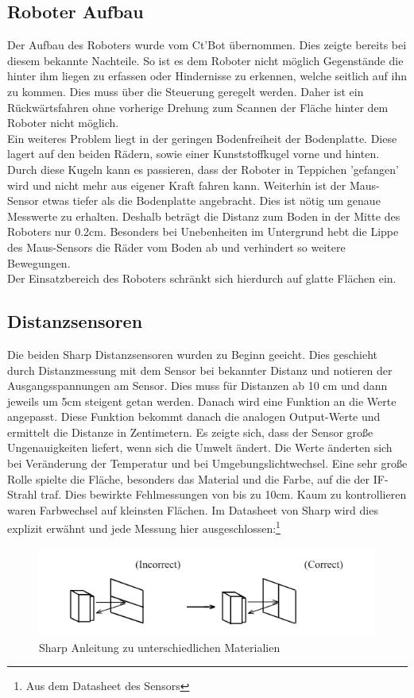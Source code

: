 \documentclass[twoside,12pt,a4paper]{report}
\begin{document}
	\subsection{Roboter Aufbau}
	Der Aufbau des Roboters wurde vom Ct'Bot übernommen. Dies zeigte bereits bei diesem bekannte Nachteile. So ist es dem Roboter nicht möglich Gegenstände die hinter ihm liegen zu erfassen oder Hindernisse zu erkennen, welche seitlich auf ihn zu kommen. Dies muss über die Steuerung geregelt werden. Daher ist ein Rückwärtsfahren ohne vorherige Drehung zum Scannen der Fläche hinter dem Roboter nicht möglich. \\
	Ein weiteres Problem liegt in der geringen Bodenfreiheit der Bodenplatte. Diese lagert auf den beiden Rädern, sowie einer Kunststoffkugel vorne und hinten. Durch diese Kugeln kann es passieren, dass der Roboter in Teppichen 'gefangen' wird und nicht mehr aus eigener Kraft fahren kann. Weiterhin ist der Maus-Sensor etwas tiefer als die Bodenplatte angebracht. Dies ist nötig um genaue Messwerte zu erhalten. Deshalb beträgt die Distanz zum Boden in der Mitte des Roboters nur 0.2cm. Besonders bei Unebenheiten im Untergrund hebt die Lippe des Maus-Sensors die Räder vom Boden ab und verhindert so weitere Bewegungen. \\
	Der Einsatzbereich des Roboters schränkt sich hierdurch auf glatte Flächen ein. 
	
	\subsection{Distanzsensoren}
	Die beiden Sharp Distanzsensoren wurden zu Beginn geeicht. Dies geschieht durch Distanzmessung  mit dem Sensor bei bekannter Distanz und notieren der Ausgangsspannungen am Sensor. Dies muss für Distanzen ab 10 cm und dann jeweils um 5cm steigent getan werden. Danach wird eine Funktion an die Werte angepasst. Diese Funktion bekommt danach die analogen Output-Werte und ermittelt die Distanze in Zentimetern. Es zeigte sich, dass der Sensor große Ungenauigkeiten liefert, wenn sich die Umwelt ändert. Die Werte änderten sich bei Veränderung der Temperatur und bei Umgebungslichtwechsel. Eine sehr große Rolle spielte die Fläche, besonders das Material und die Farbe, auf die der IF-Strahl traf. Dies bewirkte Fehlmessungen von bis zu 10cm. Kaum zu kontrollieren waren Farbwechsel auf kleinsten Flächen. Im Datasheet von Sharp wird dies explizit erwähnt und jede Messung hier ausgeschlossen:\footnote{Aus dem Datasheet des Sensors} 
	\begin{figure}[!htb]
		\centering
		\includegraphics[scale=0.5]{images/sharp2.png}
		\caption{Sharp Anleitung zu unterschiedlichen Materialien}
	\end{figure}
	
\end{document}
